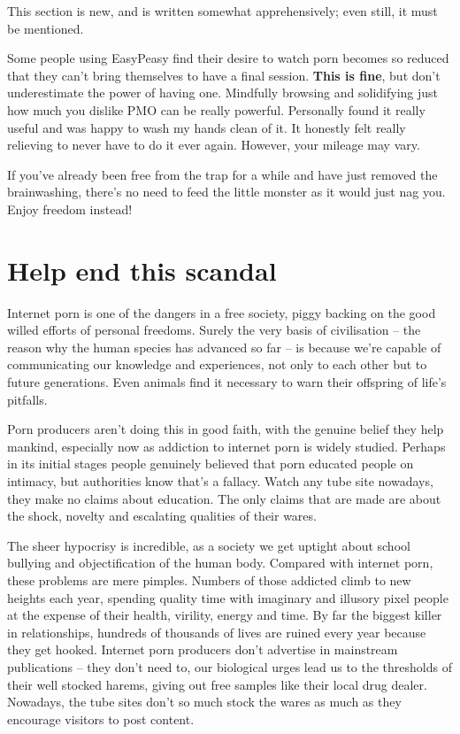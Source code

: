 \documentclass[
]{book}
\begin{document}
This section is new, and is written somewhat apprehensively; even still, it must be mentioned.

Some people using EasyPeasy find their desire to watch porn becomes so reduced that they can't bring themselves to have a final session. \textbf{This is fine}, but don't underestimate the power of having one. Mindfully browsing and solidifying just how much you dislike PMO can be really powerful. Personally found it really useful and was happy to wash my hands clean of it. It honestly felt really relieving to never have to do it ever again. However, your mileage may vary.

If you've already been free from the trap for a while and have just removed the brainwashing, there's no need to feed the little monster as it would just nag you. Enjoy freedom instead!

\hypertarget{help-end-this-scandal}{%
\section{Help end this scandal}\label{help-end-this-scandal}}

Internet porn is one of the dangers in a free society, piggy backing on the good willed efforts of personal freedoms. Surely the very basis of civilisation -- the reason why the human species has advanced so far -- is because we're capable of communicating our knowledge and experiences, not only to each other but to future generations. Even animals find it necessary to warn their offspring of life's pitfalls.

Porn producers aren't doing this in good faith, with the genuine belief they help mankind, especially now as addiction to internet porn is widely studied. Perhaps in its initial stages people genuinely believed that porn educated people on intimacy, but authorities know that's a fallacy. Watch any tube site nowadays, they make no claims about education. The only claims that are made are about the shock, novelty and escalating qualities of their wares.

The sheer hypocrisy is incredible, as a society we get uptight about school bullying and objectification of the human body. Compared with internet porn, these problems are mere pimples. Numbers of those addicted climb to new heights each year, spending quality time with imaginary and illusory pixel people at the expense of their health, virility, energy and time. By far the biggest killer in relationships, hundreds of thousands of lives are ruined every year because they get hooked. Internet porn producers don't advertise in mainstream publications -- they don't need to, our biological urges lead us to the thresholds of their well stocked harems, giving out free samples like their local drug dealer. Nowadays, the tube sites don't so much stock the wares as much as they encourage visitors to post content.
\end{document}

